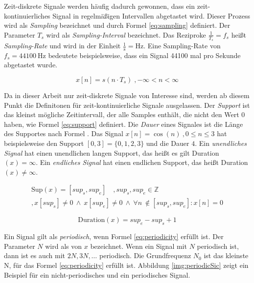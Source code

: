 Zeit-diskrete Signale werden häufig dadurch gewonnen, dass ein zeit-kontinuierliches Signal in regelmäßigen Intervallen abgetastet wird. Dieser Prozess wird als \emph{Sampling} bezeichnet und durch Formel \ref{eq:sampling} definiert. Der Parameter $T_s$ wird als \emph{Sampling-Interval} bezeichnet. Das Reziproke $\frac{1}{T_s} = f_s$ heißt \emph{Sampling-Rate} und wird in der Einheit $\frac{1}{\text{s}} = \text{Hz}$. Eine Sampling-Rate von $f_s = \SI{44100}{\hertz}$ bedeutete beispielsweise, dass ein Signal 44100 mal pro Sekunde abgetastet wurde.\cite[S. 24]{dspMichigan}

\begin{equation}
x[n] = s(n \cdot T_s) \; , -\infty < n < \infty
\label{eq:sampling}
\end{equation}
	
Da in dieser Arbeit nur zeit-diskrete Signale von Interesse sind, werden ab diesem Punkt die Definitonen für zeit-kontinuierliche Signale ausgelassen. Der \emph{Support} ist das kleinst mögliche Zeitintervall, der alle Samples enthält, die nicht den Wert 0 haben, wie Formel \ref{eq:support} definiert. Die \emph{Dauer} eines Signales ist die Länge des Supportes nach Formel . Das Signal $x[n] = \cos(n) \: ,0\leq n \leq 3$ hat beispielsweise den Support $[0,3] = \{0,1,2,3\} $ und die Dauer $4$. Ein \emph{unendliches Signal} hat einen unendlichen langen Support, das heißt es gilt Duration$(x) = \infty$. Ein \emph{endliches Signal} hat einen endlichen Support, das heißt Duration$(x) \neq\infty$. \cite[S. 24]{dspMichigan}

\begin{equation}
\label{eq:support}
\begin{split}
\text{Sup}(x) = [sup_s, sup_e] \quad , sup_s, sup_e \in \mathbb{Z} \\,  x[sup_s] \neq 0 \:  \wedge \:  x[sup_e] \neq 0 \: \wedge \: \forall n \
\not\in [sup_s, sup_e] : x[n] = 0
\end{split}
\end{equation}

\begin{equation}
\text{Duration}(x) = sup_e - sup_s + 1
\label{eq:duration}
\end{equation}

Ein Signal gilt als \emph{periodisch}, wenn Formel \ref{eq:periodicity} erfüllt ist. Der Parameter $N$ wird als  von $x$ bezeichnet. Wenn ein Signal mit $N$ periodisch ist, dann ist es auch mit $2N, 3N, \ldots $ periodisch. Die Grundfrequenz $N_0$ ist das kleinste N, für das Formel \ref{eq:periodicity} erfüllt ist. Abbildung \ref{img:periodicSic} zeigt ein Beispiel für ein nicht-periodisches und ein periodisches Signal. \cite[S. 24]{dspMichigan}

